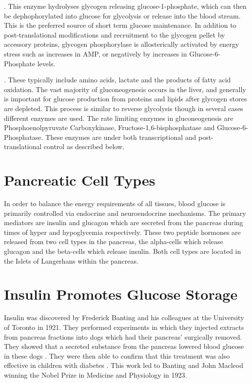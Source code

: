 \documentclass{tufte-handout}
\begin{document}
.  This enzyme hydrolyses glycogen releasing glucose-1-phosphate, which can then be dephophorylated into glucose for glycolysis or release into the blood stream.  This is the preferred source of short term glucose maintenance.  In addition to post-translational modifications and recruitment to the glycogen pellet by accessory proteins, glycogen phosphorylase is allosterically activated by energy stress such as increases in AMP, or negatively by increases in Glucose-6-Phosphate levels.

.  These typically include amino acids, lactate and the products of fatty acid oxidation.  The vast majority of gluconeogenesis occurs in the liver, and generally is important for glucose production from proteins and lipids after glycogen stores are depleted.  This process is similar to reverse glycolysis though in several cases different enzymes are used.  The rate limiting enzymes in gluconeogenesis are Phosphoenolpyruvate Carboxykinase, Fructose-1,6-bisphosphatase and Glucose-6-Phosphatase.  These enzymes are under both transcriptional and post-translational control as described below.

\section{Pancreatic Cell Types}

In order to balance the energy requirements of all tissues, blood glucose is primarily controlled via endocrine and neuroendocrine mechanisms.  The primary mediators are insulin and glucagon which are secreted from the pancreas during times of hyper and hypoglycemia respectively.  These two peptide hormones are released from two cell types in the pancreas, the alpha-cells which release glucagon and the beta-cells which release insulin.  Both cell types are located in the Islets of Langerhans within the pancreas.


\section{Insulin Promotes Glucose Storage}

Insulin was discovered by Frederick Banting and his colleagues at the University of Toronto in 1921.  They performed experiments in which they injected extracts from pancreas fractions into dogs which had their pancreas' surgically removed.  They showed that a secreted substance from the pancreas lowered blood glucose in these dogs \cite{Banting1922}.  They were then able to confirm that this treatment was also effective in children with diabetes \citep{Banting1922a}.  This work led to Banting and John Macleod winning the Nobel Prize in Medicine and Physiology in 1923.
\end{document}
